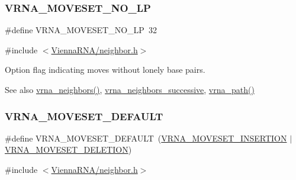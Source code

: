\subsubsection{\texorpdfstring{V\+R\+N\+A\+\_\+\+M\+O\+V\+E\+S\+E\+T\+\_\+\+N\+O\+\_\+\+LP}{VRNA\_MOVESET\_NO\_LP}}
{\footnotesize\ttfamily \#define V\+R\+N\+A\+\_\+\+M\+O\+V\+E\+S\+E\+T\+\_\+\+N\+O\+\_\+\+LP~32}



{\ttfamily \#include $<$\hyperlink{neighbor_8h}{Vienna\+R\+N\+A/neighbor.\+h}$>$}



Option flag indicating moves without lonely base pairs. 

\begin{DoxySeeAlso}{See also}
\hyperlink{group__neighbors_ga249544953933c64a6a5a20b33e3d3bc9}{vrna\+\_\+neighbors()}, \hyperlink{group__neighbors_gae5aaa1c5a1f22e889843f3edbdd04714}{vrna\+\_\+neighbors\+\_\+successive}, \hyperlink{group__paths_ga327c96463d698e7863508499cacce9ab}{vrna\+\_\+path()} 
\end{DoxySeeAlso}
\mbox{\label{group__neighbors_gaa5ffec4dd0d02df320f123e6888154d1}} 
\subsubsection{\texorpdfstring{V\+R\+N\+A\+\_\+\+M\+O\+V\+E\+S\+E\+T\+\_\+\+D\+E\+F\+A\+U\+LT}{VRNA\_MOVESET\_DEFAULT}}
{\footnotesize\ttfamily \#define V\+R\+N\+A\+\_\+\+M\+O\+V\+E\+S\+E\+T\+\_\+\+D\+E\+F\+A\+U\+LT~(\hyperlink{group__neighbors_gaf39028db9c70d3be528929182a3f2d5a}{V\+R\+N\+A\+\_\+\+M\+O\+V\+E\+S\+E\+T\+\_\+\+I\+N\+S\+E\+R\+T\+I\+ON} $\vert$ \hyperlink{group__neighbors_gac05db9392c6647e3e9a6982096c5b384}{V\+R\+N\+A\+\_\+\+M\+O\+V\+E\+S\+E\+T\+\_\+\+D\+E\+L\+E\+T\+I\+ON})}



{\ttfamily \#include $<$\hyperlink{neighbor_8h}{Vienna\+R\+N\+A/neighbor.\+h}$>$}




